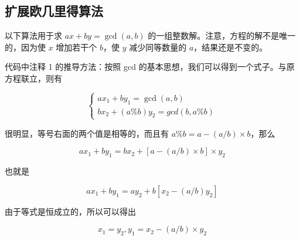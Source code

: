 \subsection{扩展欧几里得算法}
	以下算法用于求 $ax+by=\gcd(a,b)$ 的一组整数解。注意，方程的解不是唯一的，因为使 $x$ 增加若干个 $b$，使 $y$ 减少同等数量的 $a$，结果还是不变的。
	
	代码中注释 1 的推导方法：按照 gcd 的基本思想，我们可以得到一个式子。与原方程联立，则有
	
	\[ \left\{{\begin{array}{l}ax_{1}+by_{1}=\gcd(a,b)\\bx_{2}+(a\%b)y_{2}=gcd(b,a\%b)\end{array}}\right. \]
	
	很明显，等号右面的两个值是相等的，而且有 $a\%{}b=a-(a/b)\times {}b$，那么
	
	\[ ax_{1}+by_{1}=bx_{2}+[a-(a/b)\times {}b]\times {}y_{2} \]
	
	也就是
	
	\[ ax_{1}+by_{1}=ay_{2}+b[x_{2}-(a/b)y_{2}] \]
	
	由于等式是恒成立的，所以可以得出 
	
	\[ x_{1}=y_{2},y_{1}=x_{2}-(a/b)\times {}y_{2} \]
	
	